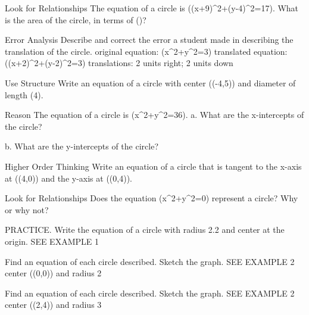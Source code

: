\documentclass{article}
\newenvironment{practice}[2]{}{}        %
\newcommand{\answer}[1]{}               %
\newcommand{\placeholder}[2]{}          %
\newcommand{\te}[1]{}                   %
\begin{document}
\begin{practice}{12}{2}
Look for Relationships The equation of a circle is ((x+9)^2+(y-4)^2=17). What is the area of the circle, in terms of (\pi)?
\answer{(17\pi)}
\end{practice}
\begin{practice}{13}{2}
Error Analysis Describe and correct the error a student made in describing the translation of the circle.
original equation: (x^2+y^2=3)
translated equation: ((x+2)^2+(y-2)^2=3)
translations: 2 units right; 2 units down
\te{The student's work is marked with a red X.}
\answer{The circle is translated 2 units left and 2 units up, not 2 units right and 2 units down.}
\end{practice}
\begin{practice}{14}{2}
Use Structure Write an equation of a circle with center ((-4,5)) and diameter of length (4).
\answer{((x+4)^2+(y-5)^2=12)}
\end{practice}
\begin{practice}{15}{2}
Reason The equation of a circle is (x^2+y^2=36).
a. What are the x-intercepts of the circle?
\answer{((6,0)) and ((-6,0))}
b. What are the y-intercepts of the circle?
\answer{((0,6)) and ((0,-6))}
\end{practice}
\begin{practice}{16}{3}
Higher Order Thinking Write an equation of a circle that is tangent to the x-axis at ((4,0)) and the y-axis at ((0,4)).
\answer{((x-4)^2+(y-4)^2=16)}
\end{practice}
\begin{practice}{17}{3}
Look for Relationships Does the equation (x^2+y^2=0) represent a circle? Why or why not?
\answer{No; a circle cannot have a radius of 0.}
\end{practice}
\begin{practice}{18}{1}
PRACTICE. Write the equation of a circle with radius 2.2 and center at the origin. SEE EXAMPLE 1
\answer{(x^2+y^2=2.2^2)}
\end{practice}
\begin{practice}{19}{2}
Find an equation of each circle described. Sketch the graph. SEE EXAMPLE 2
center ((0,0)) and radius 2
\answer{(x^2+y^2=4); see graph.}
\placeholder{graph}{Answer 19: Unit grid with black double-arrow axes x and y, O at origin, window [-5,5] on both axes, labels -4,-2,2,4. Red circle centered at origin, radius 2, intercepts (+/-2,0) and (0,+/-2).}
\end{practice}
\begin{practice}{20}{2}
Find an equation of each circle described. Sketch the graph. SEE EXAMPLE 2
center ((2,4)) and radius 3
\answer{((x-2)^2+(y-4)^2=9); see graph.}
\placeholder{graph}{Answer 20: Unit grid with black double-arrow x and y axes, O at origin, window x [-3,7], y [-2,8], x labels -2,2,4,6, y labels 2,4,6. Red circle centered at (2,4), radius 3, extrema (-1,4), (5,4), (2,1), (2,7).}
\end{practice}
\end{document}
